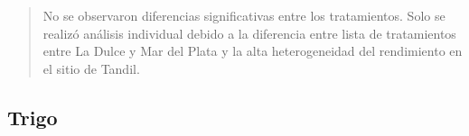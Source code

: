 \documentclass[
  letterpaper,
  DIV=11,
  numbers=noendperiod]{scrreprt}
\begin{document}
\begin{quote}
No se observaron diferencias significativas entre los tratamientos. Solo
se realizó análisis individual debido a la diferencia entre lista de
tratamientos entre La Dulce y Mar del Plata y la alta heterogeneidad del
rendimiento en el sitio de Tandil.
\end{quote}

\hypertarget{trigo}{%
\subsection{Trigo}\label{trigo}}

 
  \providecommand{\huxb}[2]{\arrayrulecolor[RGB]{#1}\global\arrayrulewidth=#2pt}
  \providecommand{\huxvb}[2]{\color[RGB]{#1}\vrule width #2pt}
  \providecommand{\huxtpad}[1]{\rule{0pt}{#1}}
  \providecommand{\huxbpad}[1]{\rule[-#1]{0pt}{#1}}
\end{document}
